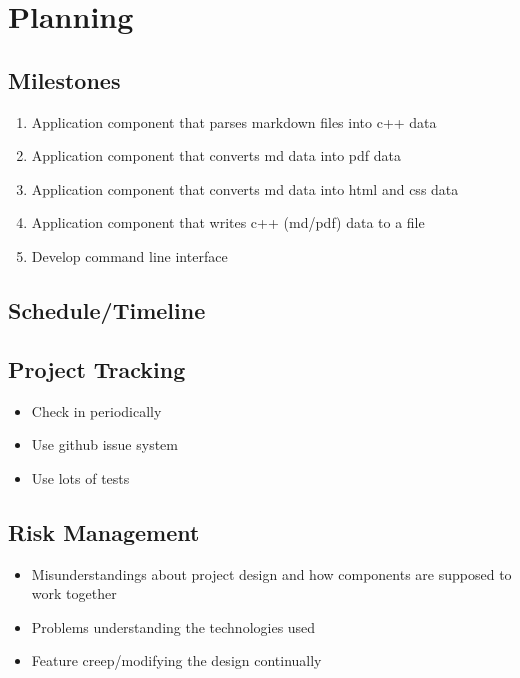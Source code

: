 \section{Planning}

\subsection{Milestones}
\begin{enumerate}
	\item Application component that parses markdown files into c++ data
	\item Application component that converts md data into pdf data
	\item Application component that converts md data into html and css data
	\item Application component that writes c++ (md/pdf) data to a file
	\item Develop command line interface
\end{enumerate}




\subsection{Schedule/Timeline}


\subsection{Project Tracking}
\begin{itemize}
	\item Check in periodically
	\item Use github issue system
	\item Use lots of tests
\end{itemize}

\subsection{Risk Management}
\begin{itemize}
	\item Misunderstandings about project design and how components are supposed to work together
	\item Problems understanding the technologies used
	\item Feature creep/modifying the design continually
\end{itemize}
